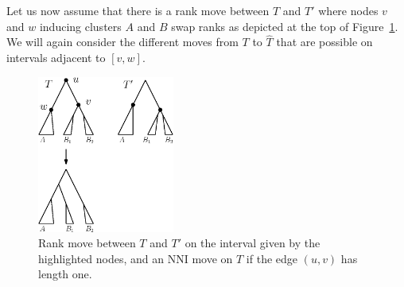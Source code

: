 \documentclass{amsart}
\newcommand{\nni}{\mathrm{NNI}}
\begin{document}
Let us now assume that there is a rank move between $T$ and $T'$ where nodes $v$ and $w$ inducing clusters $A$ and $B$ swap ranks as depicted at the top of Figure~\ref{fig:thm_fp_rank1}.
We will again consider the different moves from $T$ to $\hat T$ that are possible on intervals adjacent to $[v,w]$.

\begin{figure}[!hbt]
\centering
\includegraphics[width=0.4\textwidth]{thm_fp_rank1}
\vspace{12pt}
\caption{Rank move between $T$ and $T'$ on the interval given by the highlighted nodes, and an $\nni$ move on $T$ if the edge $(u,v)$ has length one.}
\label{fig:thm_fp_rank1}
\end{figure}
\end{document}
